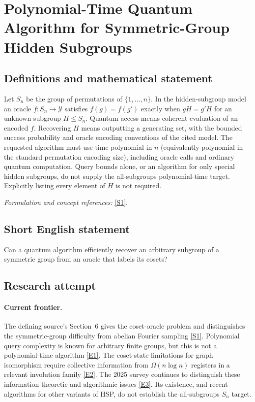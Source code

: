 \documentclass[11pt,a4paper]{article}
\newcommand{\sref}[2]{\hyperlink{source:#1:#2}{[S#2]}}
\newcommand{\eref}[2]{\hyperlink{extra:#1:#2}{[E#2]}}
\newif\ifshowcatalogue
\newcommand{\cataloguescope}[1]{\ifshowcatalogue
 \paragraph{Exact scope in the supplied catalogue.}
 \begin{quote}\small #1\end{quote}\fi}
\numberwithin{equation}{section}
\begin{document}
\setcounter{section}{0}
\clearpage
\section*{\texorpdfstring{Polynomial-Time Quantum Algorithm for Symmetric-Group Hidden Subgroups}{Polynomial-Time Quantum Algorithm for Symmetric-Group Hidden Subgroups}}\label{statement}
\subsection{Definitions and mathematical statement}
Let $S_n$ be the group of permutations of $\{1,\ldots,n\}$. In the hidden-subgroup model an oracle $f:S_n\to\mathcal Y$ satisfies
$f(g)=f(g')$ exactly when $gH=g'H$ for an unknown subgroup $H\le S_n$. Quantum access means coherent evaluation of an encoded $f$. Recovering $H$ means outputting a generating set, with the bounded success probability and oracle encoding conventions of the cited model. The requested algorithm must use time polynomial in $n$ (equivalently polynomial in the standard permutation encoding size), including oracle calls and ordinary quantum computation. Query bounds alone, or an algorithm for only special hidden subgroups, do not supply the all-subgroups polynomial-time target. Explicitly listing every element of $H$ is not required.
\par\smallskip\textit{Formulation and concept references:} \sref{statement}{1}.
\cataloguescope{Give a polynomial-time quantum algorithm that recovers a subgroup hidden by an oracle over the symmetric group S\_n.}
\subsection{Short English statement}
Can a quantum algorithm efficiently recover an arbitrary subgroup of a symmetric group from an oracle that labels its cosets?
\subsection{Research attempt}

\paragraph{Current frontier.}
The defining source's Section~6 gives the coset-oracle problem and distinguishes the symmetric-group difficulty from abelian Fourier sampling \sref{statement}{1}. Polynomial query complexity is known for arbitrary finite groups, but this is not a polynomial-time algorithm \eref{statement}{1}. The coset-state limitations for graph isomorphism require collective information from $\Omega(n\log n)$ registers in a relevant involution family \eref{statement}{2}. The 2025 survey continues to distinguish these information-theoretic and algorithmic issues \eref{statement}{3}. Its existence, and recent algorithms for other variants of HSP, do not establish the all-subgroups $S_n$ target.
\end{document}
